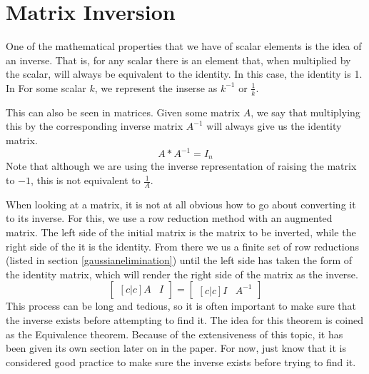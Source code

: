 \section{Matrix Inversion}
One of the mathematical properties that we have of scalar elements is the idea
of an inverse. That is, for any scalar there is an element that, when multiplied
by the scalar, will always be equivalent to the identity. In this case, the
identity is 1. In For some scalar $k$, we represent the inserse as $k^{-1}$ or
$\frac{1}{k}$.

This can also be seen in matrices. Given some matrix $A$, we say that
multiplying this by the corresponding inverse matrix $A^{-1}$ will always give us the
identity matrix. 
\begin{equation}
    A*A^{-1}=I_n
\end{equation}
Note that although we are using the inverse representation of raising the matrix
to $-1$, this is not equivalent to $\frac{1}{A}$.

When looking at a matrix, it is not at all obvious how to go about converting it
to its inverse. For this, we use a row reduction method with an augmented
matrix. The left side of the initial matrix is the matrix to be inverted, while
the right side of the it is the identity. From there we us a finite set of row
reductions (listed in section \ref{gaussianelimination}) until the left side
has taken the form of the identity matrix, which will render the right side of
the matrix as the inverse.
\begin{equation}
    \begin{bmatrix}[c|c]
        A & I
    \end{bmatrix}=
    \begin{bmatrix}[c|c]
        I & A^{-1}
    \end{bmatrix}
\end{equation}
This process can be long and tedious, so it is often important to make sure that
the inverse exists before attempting to find it. The idea for this theorem is
coined as the Equivalence theorem. Because of the extensiveness of this topic,
it has been given its own section later on in the paper. For now, just know that
it is considered good practice to make sure the inverse exists before trying to
find it.

